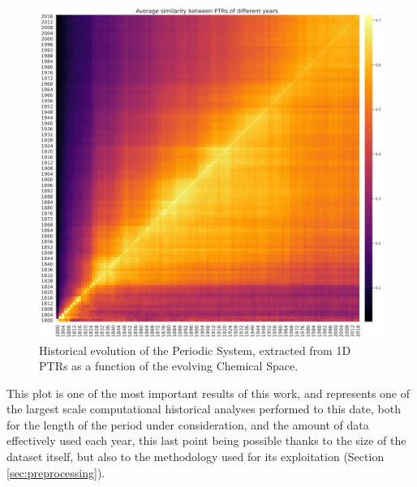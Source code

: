 \documentclass[article]{article}
\begin{document}
\begin{figure}[h!]
  \centering
	\includegraphics[width=18.0cm]{history_mat.png}
	\caption{Historical evolution of the Periodic System, extracted from 1D PTRs as a function of the evolving Chemical Space.}
	\label{fig:historicAnal}
\end{figure}

This plot is one of the most important results of this work, and represents one of the largest scale computational historical analyses performed to this date, both for the length of the period under consideration, and the amount of data effectively used each year, this last point being possible thanks to the size of the dataset itself, but also to the methodology used for its exploitation (Section \ref{sec:preprocessing}). 
\end{document}
